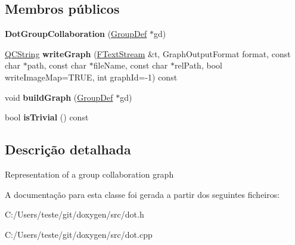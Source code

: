 \subsection*{Membros públicos}
\begin{DoxyCompactItemize}
\item 
\hypertarget{class_dot_group_collaboration_a091a39a49ee129b7edea38977304338b}{{\bfseries Dot\-Group\-Collaboration} (\hyperlink{class_group_def}{Group\-Def} $\ast$gd)}\label{class_dot_group_collaboration_a091a39a49ee129b7edea38977304338b}

\item 
\hypertarget{class_dot_group_collaboration_af38e6b184648a9550723bd18107ef428}{\hyperlink{class_q_c_string}{Q\-C\-String} {\bfseries write\-Graph} (\hyperlink{class_f_text_stream}{F\-Text\-Stream} \&t, Graph\-Output\-Format format, const char $\ast$path, const char $\ast$file\-Name, const char $\ast$rel\-Path, bool write\-Image\-Map=T\-R\-U\-E, int graph\-Id=-\/1) const }\label{class_dot_group_collaboration_af38e6b184648a9550723bd18107ef428}

\item 
\hypertarget{class_dot_group_collaboration_a59fddf91d09ee3668a67fc59d87e4e9e}{void {\bfseries build\-Graph} (\hyperlink{class_group_def}{Group\-Def} $\ast$gd)}\label{class_dot_group_collaboration_a59fddf91d09ee3668a67fc59d87e4e9e}

\item 
\hypertarget{class_dot_group_collaboration_a3359ce63bc7239a94a35485704af1993}{bool {\bfseries is\-Trivial} () const }\label{class_dot_group_collaboration_a3359ce63bc7239a94a35485704af1993}

\end{DoxyCompactItemize}


\subsection{Descrição detalhada}
Representation of a group collaboration graph 

A documentação para esta classe foi gerada a partir dos seguintes ficheiros\-:\begin{DoxyCompactItemize}
\item 
C\-:/\-Users/teste/git/doxygen/src/dot.\-h\item 
C\-:/\-Users/teste/git/doxygen/src/dot.\-cpp\end{DoxyCompactItemize}
